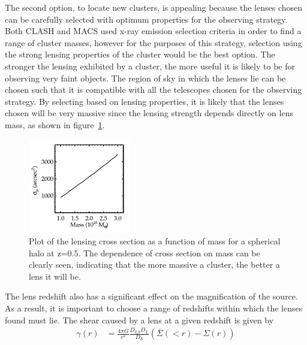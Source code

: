 	The second option, to locate new clusters, is appealing because the lenses chosen can be carefully selected with optimum properties for the observing strategy. Both CLASH and MACS used x-ray emission selection criteria in order to find a range of cluster masses, however for the purposes of this strategy, selection using the strong lensing properties of the cluster would be the best option. The stronger the lensing exhibited by a cluster, the more useful it is likely to be for observing very faint objects. The region of sky in which the lenses lie can be chosen such that it is compatible with all the telescopes chosen for the observing strategy. By selecting based on lensing properties, it is likely that the lenses chosen will be very massive since the lensing strength depends directly on lens mass, as shown in figure~\ref{fig:Lensing_cross_section_as_a_function_of_mass}\cite{Optimal_mass_configurations}.
	\begin{figure}[ht]
		\centering
			\includegraphics[width=0.4\textwidth]{../Images/Lensing_cross_section_as_a_function_of_mass.png}
		\caption[Lensing cross section as a function of mass]{\cite{Optimal_mass_configurations}Plot of the lensing cross section as a function of mass for a spherical halo at z=0.5. The dependence of cross section on mass can be clearly seen, indicating that the more massive a cluster, the better a lens it will be.\label{fig:Lensing_cross_section_as_a_function_of_mass}}
	\end{figure}

	The lens redshift also has a significant effect on the magnification of the source. As a result, it is important to choose a range of redshifts within which the lenses found must lie. The shear caused by a lens at a given redshift is given by
	\begin{align}
		\gamma(r) &= \frac{4\pi G}{c^2}\frac{D_{LS}D_{L}}{D_S}\left( \overline{\Sigma}(<r)-\Sigma(r) \right)
	\end{align}

